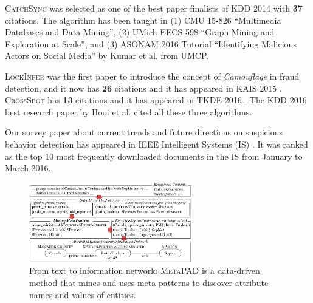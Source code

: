 \documentclass[10.5pt]{article}
\begin{document}
\begin{compactitem}
\item \textsc{CatchSync} \cite{jiang2014catchsync} was selected as one of the best paper finalists of KDD 2014 with \textbf{37} citations. The algorithm has been taught in (1) CMU 15-826 ``Multimedia Databases and Data Mining'', (2) UMich EECS 598 ``Graph Mining and Exploration at Scale'', and (3) ASONAM 2016 Tutorial ``Identifying Malicious Actors on Social Media'' by Kumar et al. from UMCP.
\item \textsc{LockInfer} \cite{jiang2014inferring} was the first paper to introduce the concept of \textit{Camouflage} in fraud detection, and it now has \textbf{26} citations and it has appeared in KAIS 2015 \cite{jiang2015inferring}. \textsc{CrossSpot} \cite{jiang2015general} has \textbf{13} citations and it has appeared in TKDE 2016 \cite{jiang2016spotting}. The KDD 2016 best research paper by Hooi et al. cited all these three algorithms.
\item Our survey paper about current trends and future directions on suspicious behavior detection has appeared in IEEE Intelligent Systems (IS) \cite{jiang2016suspicious}. It was ranked as the top 10 most frequently downloaded documents in the IS from January to March 2016.
\end{compactitem}

\vskip 0.05in
\vskip 0.01in


\begin{figure}
\vskip -0.18in
\includegraphics[width=0.63\textwidth]{figure/metapad.pdf}
\vskip -0.18in
\caption{From text to information network: \textsc{MetaPAD} \cite{jiang2016metapad} is a data-driven method that mines and uses meta patterns to discover attribute names and values of entities.}
\label{fig:metapad}
\vskip -0.12in
\end{figure}
\end{document}
